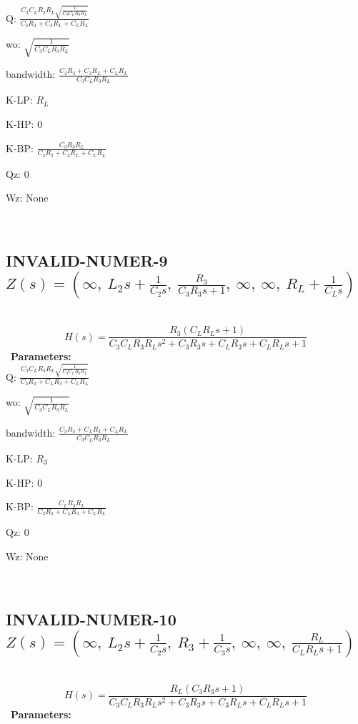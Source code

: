 \documentclass{article}
\begin{document}
Q: $\frac{C_{3} C_{L} R_{3} R_{L} \sqrt{\frac{1}{C_{3} C_{L} R_{3} R_{L}}}}{C_{3} R_{3} + C_{3} R_{L} + C_{L} R_{L}}$\ 

wo: $\sqrt{\frac{1}{C_{3} C_{L} R_{3} R_{L}}}$\ 

bandwidth: $\frac{C_{3} R_{3} + C_{3} R_{L} + C_{L} R_{L}}{C_{3} C_{L} R_{3} R_{L}}$\ 

K-LP: $R_{L}$\ 

K-HP: $0$\ 

K-BP: $\frac{C_{3} R_{3} R_{L}}{C_{3} R_{3} + C_{3} R_{L} + C_{L} R_{L}}$\ 

Qz: $0$\ 

Wz: $\text{None}$\ 

\ 

\subsection{INVALID-NUMER-9 $Z(s) = \left( \infty, \  L_{2} s + \frac{1}{C_{2} s}, \  \frac{R_{3}}{C_{3} R_{3} s + 1}, \  \infty, \  \infty, \  R_{L} + \frac{1}{C_{L} s}\right)$ } \ 
\textbf{\[H(s) = \frac{R_{3} \left(C_{L} R_{L} s + 1\right)}{C_{3} C_{L} R_{3} R_{L} s^{2} + C_{3} R_{3} s + C_{L} R_{3} s + C_{L} R_{L} s + 1}\] } \ 
\textbf{Parameters:}\\ 

Q: $\frac{C_{3} C_{L} R_{3} R_{L} \sqrt{\frac{1}{C_{3} C_{L} R_{3} R_{L}}}}{C_{3} R_{3} + C_{L} R_{3} + C_{L} R_{L}}$\ 

wo: $\sqrt{\frac{1}{C_{3} C_{L} R_{3} R_{L}}}$\ 

bandwidth: $\frac{C_{3} R_{3} + C_{L} R_{3} + C_{L} R_{L}}{C_{3} C_{L} R_{3} R_{L}}$\ 

K-LP: $R_{3}$\ 

K-HP: $0$\ 

K-BP: $\frac{C_{L} R_{3} R_{L}}{C_{3} R_{3} + C_{L} R_{3} + C_{L} R_{L}}$\ 

Qz: $0$\ 

Wz: $\text{None}$\ 

\ 

\subsection{INVALID-NUMER-10 $Z(s) = \left( \infty, \  L_{2} s + \frac{1}{C_{2} s}, \  R_{3} + \frac{1}{C_{3} s}, \  \infty, \  \infty, \  \frac{R_{L}}{C_{L} R_{L} s + 1}\right)$ } \ 
\textbf{\[H(s) = \frac{R_{L} \left(C_{3} R_{3} s + 1\right)}{C_{3} C_{L} R_{3} R_{L} s^{2} + C_{3} R_{3} s + C_{3} R_{L} s + C_{L} R_{L} s + 1}\] } \ 
\textbf{Parameters:}\\ 
\end{document}
